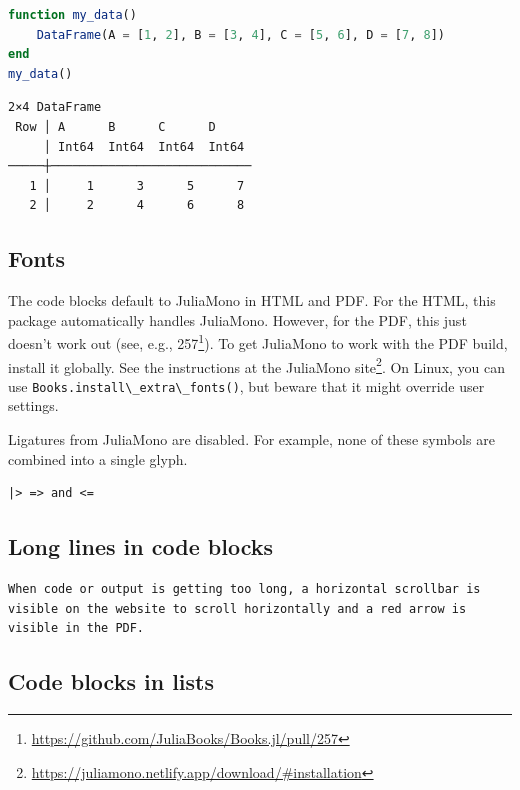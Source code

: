 \documentclass[
  notoc %
]{tufte-book}
\DeclareRobustCommand{\href}[2]{#2\footnote{\url{#1}}}
\newcommand{\passthrough}[1]{#1}
\begin{document}
\begin{lstlisting}[language=Julia]
function my_data()
    DataFrame(A = [1, 2], B = [3, 4], C = [5, 6], D = [7, 8])
end
my_data()
\end{lstlisting}

\begin{lstlisting}[language=Output]
2×4 DataFrame
 Row │ A      B      C      D
     │ Int64  Int64  Int64  Int64
─────┼────────────────────────────
   1 │     1      3      5      7
   2 │     2      4      6      8
\end{lstlisting}

\hypertarget{fonts}{%
\subsection{Fonts}\label{fonts}}

The code blocks default to JuliaMono in HTML and PDF. For the HTML, this
package automatically handles JuliaMono. However, for the PDF, this just
doesn't work out (see, e.g.,
\href{https://github.com/JuliaBooks/Books.jl/pull/257}{257}). To get
JuliaMono to work with the PDF build, install it globally. See the
instructions at the
\href{https://juliamono.netlify.app/download/\#installation}{JuliaMono
site}. On Linux, you can use
\passthrough{\lstinline!Books.install\_extra\_fonts()!}, but beware that
it might override user settings.

Ligatures from JuliaMono are disabled. For example, none of these
symbols are combined into a single glyph.

\begin{lstlisting}
|> => and <=
\end{lstlisting}

\hypertarget{long-lines-in-code-blocks}{%
\subsection{Long lines in code blocks}\label{long-lines-in-code-blocks}}

\begin{lstlisting}
When code or output is getting too long, a horizontal scrollbar is visible on the website to scroll horizontally and a red arrow is visible in the PDF.
\end{lstlisting}

\hypertarget{code-blocks-in-lists}{%
\subsection{Code blocks in lists}\label{code-blocks-in-lists}}
\end{document}
